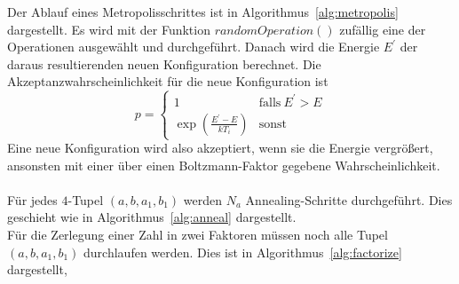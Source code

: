 Der Ablauf eines Metropolisschrittes ist in Algorithmus~\ref{alg:metropolis} dargestellt. Es wird mit der Funktion $\mathrm{\textit{randomOperation}}\left(\right)$ zufällig eine der Operationen ausgewählt und durchgeführt. Danach wird die Energie $E^\prime$ der daraus resultierenden neuen Konfiguration berechnet. Die Akzeptanzwahrscheinlichkeit für die neue Konfiguration ist
\begin{equation*}
		p=\begin{cases}
				1 & \mathrm{falls}\: E^\prime > E \\
				\exp\left(\frac{E^\prime-E}{k T_i}\right) & \mathrm{sonst}
		\end{cases}
\end{equation*}
Eine neue Konfiguration wird also akzeptiert, wenn sie die Energie vergrößert, ansonsten mit einer über einen Boltzmann-Faktor gegebene Wahrscheinlichkeit. \\
\\
Für jedes $4$-Tupel $\left(a,b,a_1,b_1\right)$ werden $N_a$ Annealing-Schritte durchgeführt. Dies geschieht wie in Algorithmus~\ref{alg:anneal} dargestellt.
\\
Für die Zerlegung einer Zahl in zwei Faktoren müssen noch alle Tupel $\left(a,b,a_1,b_1\right)$ durchlaufen werden. Dies ist in Algorithmus~\ref{alg:factorize} dargestellt,
\\

